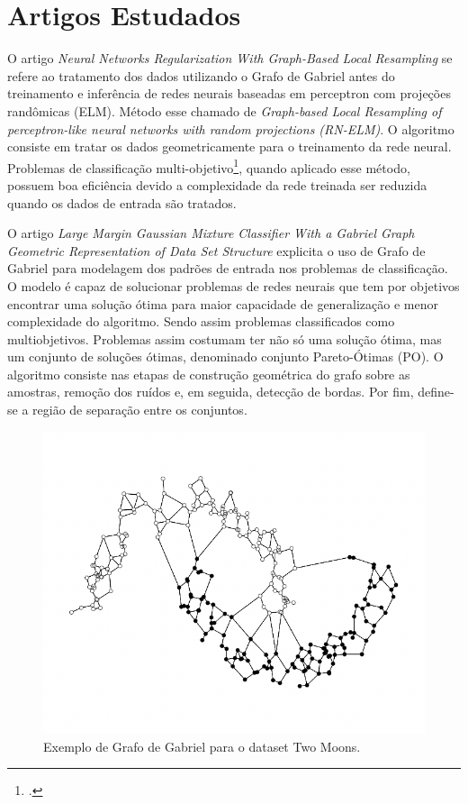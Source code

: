 \section{Artigos Estudados}

O artigo \emph{Neural Networks Regularization With Graph-Based Local Resampling}\cite{AlexAssis}
se refere ao tratamento dos dados utilizando o Grafo de Gabriel\cite{GabrielGraph1}
antes do treinamento e inferência de redes neurais baseadas em perceptron com projeções randômicas (ELM).
Método esse chamado de \emph{Graph-based Local Resampling of perceptron-like neural networks with random projections (RN-ELM)}.
O algoritmo consiste em tratar os dados geometricamente para o treinamento da rede neural. Problemas de classificação multi-objetivo\footcite{Problemas multiobjetivo: Problemas com mais de um objetivo},
quando aplicado esse método, possuem boa eficiência devido a complexidade da rede treinada ser reduzida quando os dados de entrada são tratados.

O artigo \emph{Large Margin Gaussian Mixture Classifier With a Gabriel Graph Geometric Representation of Data Set Structure}\cite{LuizBambirra}
explicita o uso de Grafo de Gabriel para modelagem dos padrões de entrada nos problemas de classificação. O modelo é capaz de solucionar problemas
de redes neurais que tem por objetivos encontrar uma solução ótima para maior capacidade de generalização e menor complexidade do algoritmo. Sendo assim problemas classificados como
multiobjetivos. Problemas assim costumam ter não só uma solução ótima, mas um conjunto de soluções ótimas, denominado conjunto Pareto-Ótimas (PO).
O algoritmo consiste nas etapas de construção geométrica do grafo sobre as amostras, remoção dos ruídos e, em seguida, detecção de bordas. Por fim, define-se
a região de separação entre os conjuntos. 

\begin{figure}[h!]
    \centering
    \includegraphics[scale=0.5]{images/GabrielGraph.png}
    \caption{Exemplo de Grafo de Gabriel para o dataset Two Moons.}
\end{figure}

